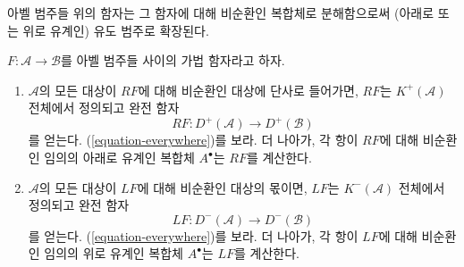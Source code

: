 \begin{proposition}
\label{proposition-enough-acyclics}
\begin{slogan}
아벨 범주들 위의 함자는 그 함자에 대해 비순환인 복합체로 분해함으로써
(아래로 또는 위로 유계인) 유도 범주로 확장된다.
\end{slogan}
$F : \mathcal{A} \to \mathcal{B}$를 아벨 범주들 사이의 가법 함자라고 하자.
\begin{enumerate}
\item $\mathcal{A}$의 모든 대상이 $RF$에 대해 비순환인 대상에 단사로
들어가면, $RF$는 $K^{+}(\mathcal{A})$ 전체에서 정의되고 완전 함자
$$
RF : D^{+}(\mathcal{A}) \longrightarrow D^{+}(\mathcal{B})
$$
를 얻는다. (\ref{equation-everywhere})를 보라. 더 나아가, 각 항이
$RF$에 대해 비순환인 임의의 아래로 유계인 복합체 $A^\bullet$는
$RF$를 계산한다.
\item $\mathcal{A}$의 모든 대상이 $LF$에 대해 비순환인 대상의 몫이면,
$LF$는 $K^{-}(\mathcal{A})$ 전체에서 정의되고 완전 함자
$$
LF : D^{-}(\mathcal{A}) \longrightarrow D^{-}(\mathcal{B})
$$
를 얻는다. (\ref{equation-everywhere})를 보라. 더 나아가, 각 항이
$LF$에 대해 비순환인 임의의 위로 유계인 복합체 $A^\bullet$는
$LF$를 계산한다.
\end{enumerate}
\end{proposition}

